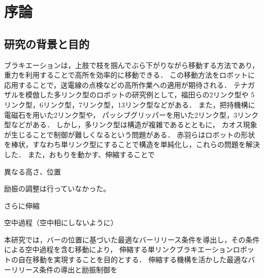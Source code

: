 \chapter[序論]%
        {序論}
        \section{研究の背景と目的}

          ブラキエーションは，上肢で枝を掴んでぶら下がりながら移動する方法であり，重力を利用することで高所を効率的に移動できる．
          この移動方法をロボットに応用することで\cite{福田敏男1990ブラキエーション形移動ロボットの研究}，送電線の点検などの高所作業への適用が期待される．
          テナガザルを模倣した多リンク型のロボットの研究例として，福田らの2リンク型\cite{福田敏男1991ブラキエーション形移動ロボットの研究2}\cite{福田敏男1992ブラキエーション形移動ロボットの研究}\cite{齋藤史倫1993ブラキエーション形移動ロボットの研究}\cite{齋藤史倫1995学習とロボット}\cite{福田敏男1996強化学習法を用いたファジィコントローラの生成}\cite{中西淳1998解析的手法による}\cite{中西淳19992}\cite{中西淳2001ハイブリッドコントローラによる}や
          5リンク型\cite{福田敏男1991ブラキエーション形移動ロボットの研究}，6リンク型\cite{福田敏男1990ブラキエーション形移動ロボットの研究}，7リンク型\cite{齋藤史倫1994ブラキエーション形移動ロボットの研究}，13リンク型\cite{長谷川泰久2001ブラキエーション形移動ロボットの研究}などがある．
          また，把持機構に電磁石を用いた2リンク型\cite{山川雄司2016ブラキエーションロボットの開発と運動生成}\cite{山川雄司2016-2ブラキエーションロボットの開発と運動生成}や，
          パッシブグリッパーを用いた2リンク型\cite{javadi2023acromonk}，3リンク型\cite{grama2024ricmonk}などがある．
          しかし，多リンク型は構造が複雑であるとともに，
          カオス現象\cite{鈴木三男2000二重振り子におけるカオス的振舞}が生じることで制御が難しくなるという問題がある．
          赤羽らはロボットの形状を棒状，すなわち単リンク型にすることで構造を単純化し，これらの問題を解決した\cite{akahane2022single}．
          また，おもりを動かす、伸縮することで


          異なる高さ、位置

          励振の調整は行っていなかった。

          さらに伸縮

          空中過程（空中相にしないように）

          本研究では，バーの位置に基づいた最適なバーリリース条件を導出し，その条件による空中過程を含む移動により，
          伸縮する単リンクブラキエーションロボットの自在移動を実現することを目的とする．
          伸縮する機構を活かした最適なバーリリース条件の導出と励振制御を




